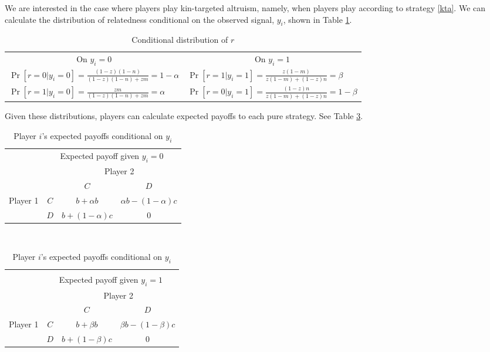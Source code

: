 \documentclass[12pt]{article}
\begin{document}
We are interested in the case where players play kin-targeted altruism, namely, when players play according to strategy \ref{kta}. We can calculate the distribution of relatedness conditional on the observed signal, $y_{i}$, shown in Table \ref{table:zdistyi}. 

\begin{table}[h]
\center
\caption{Conditional distribution of $r$} \vspace{-1ex} 
\begin{tabular}{|l|l|}
\multicolumn{1}{c}{On $y_{i}=0$} & \multicolumn{1}{c}{On $y_{i}=1$} \\
\cline{1-2}
$\Pr[r=0|y_{i}=0]=\frac{(1-z)(1-n)}{(1-z)(1-n)+zm}=1-\alpha$ & $\Pr[r=1|y_{i}=1]=\frac{z(1-m)}{z(1-m)+(1-z)n}=\beta$ \\
\cline{1-2}
$\Pr[r=1|y_{i}=0]=\frac{zm}{(1-z)(1-n)+zm}=\alpha$ & $\Pr[r=0|y_{i}=1]=\frac{(1-z)n}{z(1-m)+(1-z)n}=1-\beta$ \\
\cline{1-2}
\end{tabular}
\label{table:zdistyi} 
\end{table}

Given these distributions, players can calculate expected payoffs to each pure strategy. See Table \ref{table:expected}.

\begin{table}[h]
\center
\caption{Player $i$'s expected payoffs conditional on $y_{i}$} \vspace{1ex}
\begin{tabular}{cc|c|c|}
& \multicolumn{3}{c}{Expected payoff given $y_{i}=0$} \\
\multicolumn{2}{c}{}  & \multicolumn{2}{c}{\small Player 2} \\
& \multicolumn{1}{c}{} & \multicolumn{1}{c}{$C$} & \multicolumn{1}{c}{$D$} \\
\cline{3-4}
{\small Player 1} & $C$ & \multicolumn{1}{|c}{$b+\alpha b$} & \multicolumn{1}{|c|}{$%
\alpha b-(1- \alpha )c$} \\ \cline{3-4} & $D$ &
\multicolumn{1}{|c}{$b+(1- \alpha )c$} & \multicolumn{1}{|c|}{$0$} \\
\cline{3-4}
\end{tabular}%
\qquad \\
\begin{tabular}{cc|c|c|}
\multicolumn{4}{c}{ } \\
& \multicolumn{3}{c}{Expected payoff given $y_{i}=1$} \\
\multicolumn{2}{c}{}  & \multicolumn{2}{c}{\small Player 2} \\
& \multicolumn{1}{c}{} & \multicolumn{1}{c}{$C$} & \multicolumn{1}{c}{$D$} \\
\cline{3-4}
{\small Player 1} & $C$ & \multicolumn{1}{|c}{$b+\beta b$} & \multicolumn{1}{|c|}{$%
\beta b-(1-\beta )c$} \\ \cline{3-4} & $D$ &
\multicolumn{1}{|c}{$b+(1- \beta )c$} & \multicolumn{1}{|c|}{$0$} \\
\cline{3-4}
\end{tabular}
\label{table:expected}
\end{table}
\end{document}

